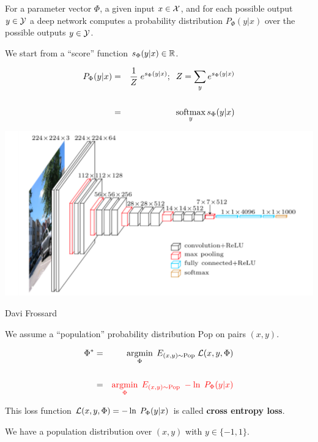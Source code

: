 {\vfill
For a parameter vector $\Phi$, a given input $x \in {\cal X}$, and for each possible output $y \in {\cal Y}$ a deep network computes a probability
distribution $P_\Phi(y|x)$ over the possible outputs $y \in {\cal Y}$.


We start from a ``score'' function $s_\Phi(y|x) \in \mathbb{R}$.

\vfill
\begin{eqnarray*}
  P_\Phi(y|x) & = & \frac{1}{Z}\;e^{s_\Phi(y|x)};\;\; Z = \sum_y e^{s_\Phi(y|x)} \\
  \\
  & = & \operatorname*{softmax}_y s_\Phi(y|x)
\end{eqnarray*}


\centerline{\includegraphics[width = 8.0in]{../images/VGG}}
\centerline{\large Davi Frossard}


We assume a ``population'' probability distribution $\mathrm{Pop}$ on pairs $(x,y)$.

\vfill
\begin{eqnarray*}
\Phi^* & = & \operatorname*{argmin}_\Phi \;E_{(x,y) \sim \mathrm{Pop}}\;{\cal L}(x,y,\Phi) \\
\\
& = & {\color{red} \operatorname*{argmin}_\Phi \;E_{(x,y) \sim \mathrm{Pop}}\; -\ln \;P_\Phi(y|x)}
\end{eqnarray*}

\vfill
This loss function ${\cal L}(x,y,\Phi) = - \ln \;P_\Phi(y|x)$ is called {\bf cross entropy loss}.


We have a population distribution over $(x,y)$ with $y \in \{-1,1\}$.

}
